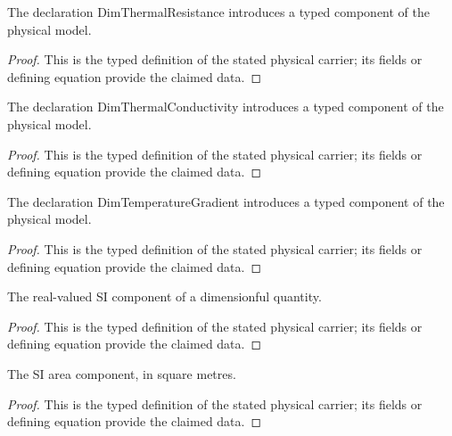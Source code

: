 \begin{definition}
  \label{def:physics:IPhO_2026_4_C_6:aux016}
  The declaration DimThermalResistance introduces a typed component of the physical model.
\end{definition}
\begin{proof}
  This is the typed definition of the stated physical carrier; its fields or defining equation provide the claimed data.
\end{proof}

\begin{definition}
  \label{def:physics:IPhO_2026_4_C_6:aux017}
  The declaration DimThermalConductivity introduces a typed component of the physical model.
\end{definition}
\begin{proof}
  This is the typed definition of the stated physical carrier; its fields or defining equation provide the claimed data.
\end{proof}

\begin{definition}
  \label{def:physics:IPhO_2026_4_C_6:aux018}
  The declaration DimTemperatureGradient introduces a typed component of the physical model.
\end{definition}
\begin{proof}
  This is the typed definition of the stated physical carrier; its fields or defining equation provide the claimed data.
\end{proof}

\begin{definition}
  \label{def:physics:IPhO_2026_4_C_6:aux019}
  The real-valued SI component of a dimensionful quantity.
\end{definition}
\begin{proof}
  This is the typed definition of the stated physical carrier; its fields or defining equation provide the claimed data.
\end{proof}

\begin{definition}
  \label{def:physics:IPhO_2026_4_C_6:aux020}
  The SI area component, in square metres.
\end{definition}
\begin{proof}
  This is the typed definition of the stated physical carrier; its fields or defining equation provide the claimed data.
\end{proof}

